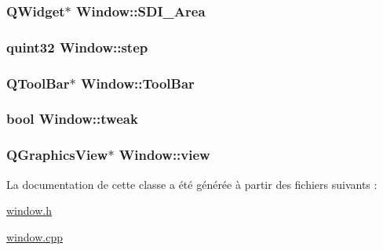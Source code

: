 \subsubsection[{S\+D\+I\+\_\+\+Area}]{\setlength{\rightskip}{0pt plus 5cm}Q\+Widget$\ast$ Window\+::\+S\+D\+I\+\_\+\+Area\hspace{0.3cm}{\ttfamily [private]}}\label{class_window_a55a97331e4e4e17aabcce45167d2f8af}
\hypertarget{class_window_ac76fcc8528da0030c28384400096bca6}{}
\subsubsection[{step}]{\setlength{\rightskip}{0pt plus 5cm}quint32 Window\+::step\hspace{0.3cm}{\ttfamily [private]}}\label{class_window_ac76fcc8528da0030c28384400096bca6}
\hypertarget{class_window_a3577da92dfb4018b7f8629148adbd65f}{}
\subsubsection[{Tool\+Bar}]{\setlength{\rightskip}{0pt plus 5cm}Q\+Tool\+Bar$\ast$ Window\+::\+Tool\+Bar\hspace{0.3cm}{\ttfamily [private]}}\label{class_window_a3577da92dfb4018b7f8629148adbd65f}
\hypertarget{class_window_a52e7d4e63f98e761696b4e5e0296c053}{}
\subsubsection[{tweak}]{\setlength{\rightskip}{0pt plus 5cm}bool Window\+::tweak}\label{class_window_a52e7d4e63f98e761696b4e5e0296c053}
\hypertarget{class_window_a0352598340064ec6dd7952dbad06ce0d}{}
\subsubsection[{view}]{\setlength{\rightskip}{0pt plus 5cm}Q\+Graphics\+View$\ast$ Window\+::view\hspace{0.3cm}{\ttfamily [private]}}\label{class_window_a0352598340064ec6dd7952dbad06ce0d}


La documentation de cette classe a été générée à partir des fichiers suivants \+:\begin{DoxyCompactItemize}
\item 
\hyperlink{window_8h}{window.\+h}\item 
\hyperlink{window_8cpp}{window.\+cpp}\end{DoxyCompactItemize}

